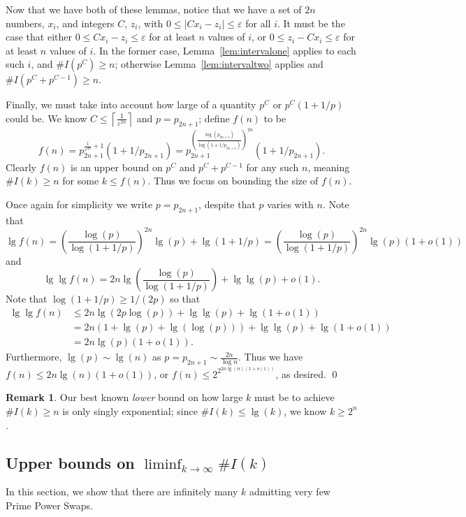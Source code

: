 \documentclass{article}
\theoremstyle{definition}
\newtheorem*{remark}{Remark}
\theoremstyle{remark}
\numberwithin{equation}{section}
\numberwithin{case}{theorem}
\begin{document}
Now that we have both of these lemmas, notice that we have a set of $2n$ numbers, $x_i$, and integers $C$, $z_i$, with $0 \leq |Cx_i - z_i| \leq \varepsilon$ for all $i$. It must be the case that either $0 \leq Cx_i - z_i \leq \varepsilon$ for at least $n$ values of $i$, or $0 \leq z_i - Cx_i \leq \varepsilon$ for at least $n$ values of $i$. In the former case, Lemma~\ref{lem:intervalone} applies to each such $i$, and $\#I(p^C) \geq n$; otherwise Lemma~\ref{lem:intervaltwo} applies and $\#I(p^C + p^{C-1}) \geq n$.

Finally, we must take into account how large of a quantity $p^C$ or $p^C(1 + 1/p)$ could be. We know $C \leq \left\lceil \frac{1}{\varepsilon^{2n}} \right\rceil$ and $p = p_{2n+1}$; define $f(n)$ to be
\[
  f(n) = p_{2n+1}^{\frac{1}{\varepsilon^{2n}} + 1}(1 + 1/p_{2n+1}) = p_{2n+1}^{\left( \frac{\log(p_{2n+1})}{\log(1 + 1/p_{2n+1})}  \right)^{2n}}(1 + 1/p_{2n+1}).
\]
Clearly $f(n)$ is an upper bound on $p^C$ and $p^C + p^{C-1}$ for any such $n$, meaning $\#I(k) \geq n$ for some $k \leq f(n)$. Thus we focus on bounding the size of $f(n)$.

Once again for simplicity we write $p = p_{2n+1}$, despite that $p$ varies with $n$. Note that
\[
  \lg f(n) = \left(\frac{\log(p)}{\log(1 + 1/p)}\right)^{2n} \lg(p) + \lg(1 + 1/p) = \left(\frac{\log(p)}{\log(1 + 1/p)}\right)^{2n} \lg(p) (1 + o(1))
\]
and
\[
  \lg \lg f(n) = 2n \lg \left(\frac{\log(p)}{\log(1 + 1/p)}\right) + \lg \lg(p) + o(1).
\]
Note that $\log(1 + 1/p) \geq 1/(2p)$ so that
\begin{align*}
  \lg \lg f(n) &\leq 2n \lg ( 2p\log(p) ) + \lg \lg (p) + \lg(1 + o(1)) \\
  &= 2n(1 + \lg(p) + \lg(\log(p))) + \lg \lg (p) + \lg(1 + o(1)) \\
  &= 2n \lg(p) (1 + o(1)).
\end{align*}
Furthermore, $\lg(p) \sim \lg(n)$ as $p = p_{2n+1} \sim \frac{2n}{\log n}$. Thus we have $f(n) \leq 2n \lg(n) (1 + o(1))$, or $f(n) \leq 2^{2^{2n \lg(n) (1 + o(1))}}$, as desired. \qed



\begin{remark}
  Our best known \emph{lower} bound on how large $k$ must be to achieve $\#I(k) \geq n$ is only singly exponential; since $\#I(k) \leq \lg(k)$, we know $k \geq 2^n$.
\end{remark}

\subsection{Upper bounds on \texorpdfstring{$\liminf_{k \to \infty} \#I(k)$}{liminf \#I(k)}}
In this section, we show that there are infinitely many $k$ admitting very few Prime Power Swaps.
\end{document}

